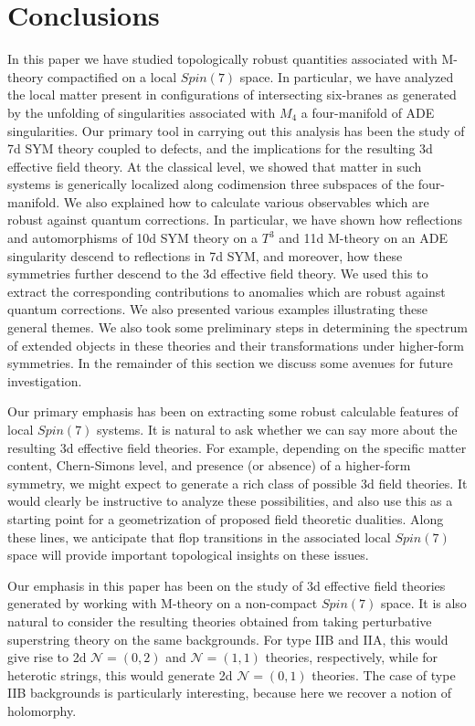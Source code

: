 \documentclass[12pt]{article}%
\numberwithin{equation}{section}
\renewcommand{\(}{\left(}
\renewcommand{\)}{\right)}
\renewcommand{\[}{\left[}
\renewcommand{\]}{\right]}
\begin{document}
\section{Conclusions \label{sec:CONC}}

In this paper we have studied topologically robust quantities associated with M-theory compactified on a local $Spin(7)$ space.
In particular, we have analyzed the local matter present in configurations of intersecting six-branes as generated by the unfolding of
singularities associated with $M_4$ a four-manifold of ADE singularities. Our primary tool in carrying out this analysis has been
the study of 7d SYM theory coupled to defects, and the implications for the resulting 3d effective field theory. At the classical
level, we showed that matter in such systems is generically localized along codimension three subspaces of the four-manifold.
We also explained how to calculate various observables which are robust against quantum corrections. In particular,
we have shown how reflections and automorphisms of 10d SYM theory on a $T^3$ and 11d M-theory on
an ADE singularity descend to reflections in 7d SYM, and moreover, how these symmetries further descend to the 3d effective field theory.
We used this to extract the corresponding contributions to anomalies which are robust against quantum corrections.
We also presented various examples illustrating these general themes.
We also took some preliminary steps in determining the spectrum of extended objects in these theories
and their transformations under higher-form symmetries.
In the remainder of this section we discuss some avenues for future investigation.

Our primary emphasis has been on extracting some robust calculable features of local $Spin(7)$ systems.
It is natural to ask whether we can say more about the resulting 3d effective field theories.
For example, depending on the specific matter content, Chern-Simons level, and presence (or absence) of a higher-form symmetry,
we might expect to generate a rich class of possible 3d field theories. It would clearly be instructive to analyze these possibilities,
and also use this as a starting point for a geometrization of proposed field theoretic dualities. Along these lines, we anticipate
that flop transitions in the associated local $Spin(7)$ space will provide important topological insights on these issues.

Our emphasis in this paper has been on the study of 3d effective field theories generated by working with M-theory on a
non-compact $Spin(7)$ space. It is also natural to consider the resulting theories obtained from taking perturbative superstring theory on the
same backgrounds. For type IIB and IIA, this would give rise to 2d $\mathcal{N} = (0,2)$ and $\mathcal{N} = (1,1)$ theories, respectively, while for heterotic strings, this would generate 2d $\mathcal{N} = (0,1)$ theories. The case of type IIB backgrounds is particularly interesting, because here we recover a notion of holomorphy.
\end{document}
